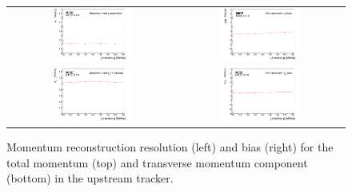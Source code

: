 \begin{figure}[htb]
  \begin{center}
    \begin{tabular}{cc}
      \includegraphics[width=0.49\textwidth]{upstream_p_resolution_p_logo.png} &	
      \includegraphics[width=0.49\textwidth]{upstream_p_bias_p_logo.png} \\
      \includegraphics[width=0.49\textwidth]{upstream_pt_resolution_p_logo.png} &
      \includegraphics[width=0.49\textwidth]{upstream_pt_bias_p_logo.png}
    \end{tabular}
  \end{center}
  \caption{
    Momentum reconstruction resolution (left) and bias
    (right) for the total momentum (top) and transverse momentum
    component (bottom) in the upstream tracker.
  }
  \label{trackers:performance:resolutions:up}
\end{figure}
